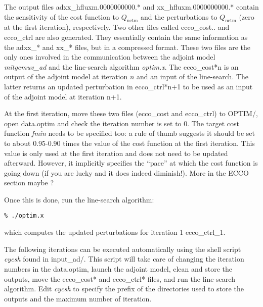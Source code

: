 The output files adxx\_hfluxm.0000000000.* and xx\_hfluxm.0000000000.* contain
the sensitivity of the cost function to $Q_\mathrm{netm}$ and the perturbations
to $Q_\mathrm{netm}$ (zero at the first iteration), respectively. Two other
files called ecco\_cost.. and ecco\_ctrl are also generated. They essentially
contain the same information as the adxx\_* and xx\_* files, but in a
compressed format. These two files are the only ones involved in the
communication between the adjoint model {\it mitgcmuv\_ad} and the line-search
algorithm {\it optim.x}. The ecco\_cost*n is an output of the adjoint model at
iteration $n$ and an input of the line-search. The latter returns an updated
perturbation in ecco\_ctrl*n+1 to be used as an input of the adjoint model at
iteration n+1. 

At the first iteration, move these two files (ecco\_cost and ecco\_ctrl) to
OPTIM/, open data.optim and check the iteration number is set to 0. The target
cost function {\it fmin} needs to be specified too: a rule of thumb suggests
it should be set to about 0.95-0.90 times the value of the cost function at
the first iteration. This value is only used at the first iteration and does
not need to be updated afterward. However, it implicitly specifies the
``pace'' at which the cost function is going down (if you are lucky and it does
indeed diminish!). More in the ECCO section maybe ?

Once this is done, run the line-search algorithm:
\begin{verbatim}
% ./optim.x
\end{verbatim}
which computes the updated perturbations for iteration 1 ecco\_ctrl\_1.

The following iterations can be executed automatically using the shell
script {\it cycsh} found in input\_ad/. This script will take care of changing
the iteration numbers in the data.optim, launch the adjoint model, clean and
store the outputs, move the ecco\_cost* and ecco\_ctrl* files, and run the
line-search algorithm. Edit {\it cycsh} to specify the prefix of the
directories used to store the outputs and the maximum number of iteration.

